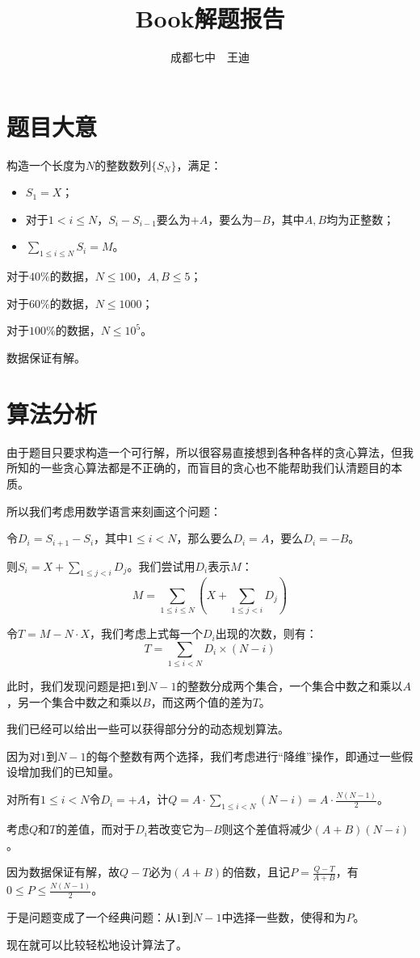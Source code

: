 \documentclass[a4paper]{article}
\begin{document}
\title{Book解题报告}
\author{成都七中\ \  王迪}
\maketitle
\tableofcontents

\newpage

\section{题目大意}
构造一个长度为$N$的整数数列$\{S_N\}$，满足：
\begin{itemize}
\item $S_1 = X$；
\item 对于$1 < i \le N$，$S_i - S_{i-1}$要么为$+A$，要么为$-B$，其中$A,B$均为正整数；
\item $\sum_{1 \le i \le N}{S_i} = M$。
\end{itemize}
\par
对于$40\%$的数据，$N \le 100$，$A,B \le 5$； \par
对于$60\%$的数据，$N \le 1000$； \par
对于$100\%$的数据，$N \le 10^5$。 \par
数据保证有解。

\section{算法分析}
由于题目只要求构造一个可行解，所以很容易直接想到各种各样的贪心算法，但我所知的一些贪心算法都是不正确的，而盲目的贪心也不能帮助我们认清题目的本质。 \par
所以我们考虑用数学语言来刻画这个问题： \par
令$D_i = S_{i + 1} - S_i$，其中$1 \le i < N$，那么要么$D_i = A$，要么$D_i = -B$。 \par
则$S_i = X + \sum_{1 \le j < i}{D_j}$。我们尝试用$D_i$表示$M$：
\[
M = \sum_{1 \le i \le N}(X + \sum_{1 \le j < i}{D_j})
\]
\par
令$T = M - N \cdot X$，我们考虑上式每一个$D_i$出现的次数，则有：
\[
T = \sum_{1 \le i < N}{D_i \times (N - i)}
\]
\par
此时，我们发现问题是把$1$到$N-1$的整数分成两个集合，一个集合中数之和乘以$A$，另一个集合中数之和乘以$B$，而这两个值的差为$T$。 \par
我们已经可以给出一些可以获得部分分的动态规划算法。 \par
因为对$1$到$N-1$的每个整数有两个选择，我们考虑进行“降维”操作，即通过一些假设增加我们的已知量。 \par
对所有$1 \le i < N$令$D_i = +A$，计$Q = A \cdot \sum_{1 \le i < N}(N - i) = A \cdot \frac{N(N - 1)}{2}$。 \par
考虑$Q$和$T$的差值，而对于$D_i$若改变它为$-B$则这个差值将减少$(A+B)(N-i)$。 \par
因为数据保证有解，故$Q-T$必为$(A+B)$的倍数，且记$P=\frac{Q-T}{A+B}$，有$0 \le P \le \frac{N(N - 1)}{2}$。 \par
于是问题变成了一个经典问题：从$1$到$N-1$中选择一些数，使得和为$P$。 \par
现在就可以比较轻松地设计算法了。
\end{document}
